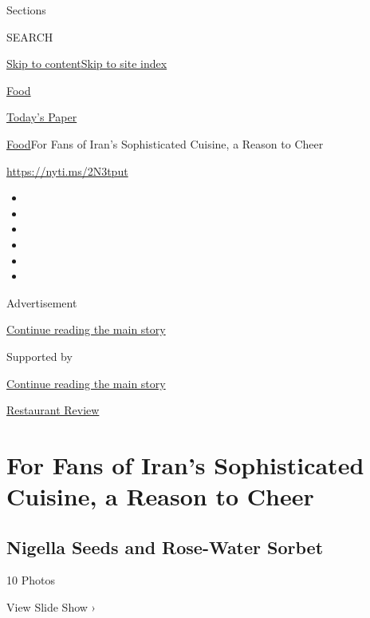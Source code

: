 Sections

SEARCH

\protect\hyperlink{site-content}{Skip to
content}\protect\hyperlink{site-index}{Skip to site index}

\href{https://www.nytimes3xbfgragh.onion/section/food}{Food}

\href{https://myaccount.nytimes3xbfgragh.onion/auth/login?response_type=cookie\&client_id=vi}{}

\href{https://www.nytimes3xbfgragh.onion/section/todayspaper}{Today's
Paper}

\href{/section/food}{Food}\textbar{}For Fans of Iran's Sophisticated
Cuisine, a Reason to Cheer

\url{https://nyti.ms/2N3tput}

\begin{itemize}
\item
\item
\item
\item
\item
\item
\end{itemize}

Advertisement

\protect\hyperlink{after-top}{Continue reading the main story}

Supported by

\protect\hyperlink{after-sponsor}{Continue reading the main story}

\href{/column/restaurant-review}{Restaurant Review}

\hypertarget{for-fans-of-irans-sophisticated-cuisine-a-reason-to-cheer}{%
\section{For Fans of Iran's Sophisticated Cuisine, a Reason to
Cheer}\label{for-fans-of-irans-sophisticated-cuisine-a-reason-to-cheer}}

\href{https://www.nytimes3xbfgragh.onion/slideshow/2018/09/11/dining/sofreh-brooklyn.html}{}

\hypertarget{nigella-seeds-and-rose-water-sorbet}{%
\subsection{Nigella Seeds and Rose-Water
Sorbet}\label{nigella-seeds-and-rose-water-sorbet}}

10 Photos

View Slide Show ›

